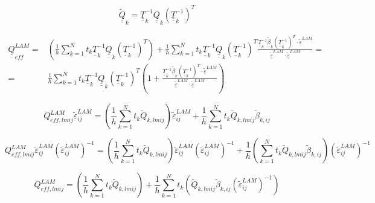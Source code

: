\documentclass[review]{elsarticle}
\begin{document}
\begin{equation}
\underline{\underline{\tilde{Q}}}_{k}=\underline{\underline{T}}_{k}^{-1}\underline{\underline{Q}}_{k}\left(\underline{\underline{T}}_{k}^{-1}\right)^{T}
\end{equation}

\begin{equation}
\begin{aligned}
\underline{\underline{Q}}_{eff}^{LAM}=&\left(\frac{1}{h}\sum_{k=1}^{N}t_{k}\underline{\underline{T}}_{k}^{-1}\underline{\underline{Q}}_{k}\left(\underline{\underline{T}}_{k}^{-1}\right)^{T}\right)+\frac{1}{h}\sum_{k=1}^{N}t_{k}\underline{\underline{T}}_{k}^{-1}\underline{\underline{Q}}_{k}\left(\underline{\underline{T}}_{k}^{-1}\right)^{T}\frac{\underline{\underline{T}}_{k}^{-1}\underline{\tilde{\beta}}_{k}\left(\underline{\underline{T}}_{k}^{-1}\right)^{T}\cdot\underline{\tilde{\varepsilon}}^{LAM}}{\underline{\tilde{\varepsilon}}^{LAM}\cdot\underline{\tilde{\varepsilon}}^{LAM}}=\\
=&\frac{1}{h}\sum_{k=1}^{N}t_{k}\underline{\underline{T}}_{k}^{-1}\underline{\underline{Q}}_{k}\left(\underline{\underline{T}}_{k}^{-1}\right)^{T}\left(1+\frac{\underline{\underline{T}}_{k}^{-1}\underline{\tilde{\beta}}_{k}\left(\underline{\underline{T}}_{k}^{-1}\right)^{T}\cdot\underline{\tilde{\varepsilon}}^{LAM}}{\underline{\tilde{\varepsilon}}^{LAM}\cdot\underline{\tilde{\varepsilon}}^{LAM}}\right)
\end{aligned}
\end{equation}

\begin{equation}
Q_{eff,lmij}^{LAM}\tilde{\varepsilon}_{ij}^{LAM}=\left(\frac{1}{h}\sum_{k=1}^{N}t_{k}\tilde{Q}_{k,lmij}\right)\tilde{\varepsilon}_{ij}^{LAM}+\frac{1}{h}\sum_{k=1}^{N}t_{k}\tilde{Q}_{k,lmij}\tilde{\beta}_{k,ij}
\end{equation}

\begin{equation}
Q_{eff,lmij}^{LAM}\tilde{\varepsilon}_{ij}^{LAM}\left(\tilde{\varepsilon}_{ij}^{LAM}\right)^{-1}=\left(\frac{1}{h}\sum_{k=1}^{N}t_{k}\tilde{Q}_{k,lmij}\right)\tilde{\varepsilon}_{ij}^{LAM}\left(\tilde{\varepsilon}_{ij}^{LAM}\right)^{-1}+\frac{1}{h}\left(\sum_{k=1}^{N}t_{k}\tilde{Q}_{k,lmij}\tilde{\beta}_{k,ij}\right)\left(\tilde{\varepsilon}_{ij}^{LAM}\right)^{-1}
\end{equation}

\begin{equation}
Q_{eff,lmij}^{LAM}=\left(\frac{1}{h}\sum_{k=1}^{N}t_{k}\tilde{Q}_{k,lmij}\right)+\frac{1}{h}\sum_{k=1}^{N}t_{k}\left(\tilde{Q}_{k,lmij}\tilde{\beta}_{k,ij}\left(\tilde{\varepsilon}_{ij}^{LAM}\right)^{-1}\right)
\end{equation}
\end{document}
